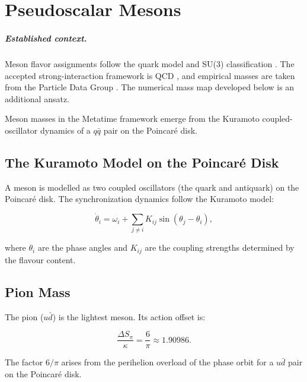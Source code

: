 \chapter{Pseudoscalar Mesons}
\label{ch:pseudoscalar_mesons}


\paragraph{Established context.}
Meson flavor assignments follow the quark model and SU(3) classification
\cite{GellMann1962,GellMann1964,Zweig1964}.  The accepted strong-interaction
framework is QCD \cite{GrossWilczek1973,Politzer1973,Wilson1974}, and empirical
masses are taken from the Particle Data Group \cite{PDG2024}.  The numerical
mass map developed below is an additional ansatz.

Meson masses in the Metatime framework emerge from the Kuramoto
coupled-oscillator dynamics of a \(q\bar{q}\) pair on the Poincar\'{e}
disk.

\section{The Kuramoto Model on the Poincar\'{e} Disk}

A meson is modelled as two coupled oscillators (the quark and antiquark)
on the Poincar\'{e} disk.  The synchronization dynamics follow the Kuramoto
model:

\[
\dot{\theta}_i = \omega_i + \sum_{j \neq i} K_{ij} \sin(\theta_j - \theta_i),
\]

where \(\theta_i\) are the phase angles and \(K_{ij}\) are the coupling
strengths determined by the flavour content.

\section{Pion Mass}

The pion (\(u\bar{d}\)) is the lightest meson.  Its action offset is:

\begin{equation}
\frac{\Delta S_\pi}{\kappa} = \frac{6}{\pi} \approx 1.90986.
\label{eq:pion_action}
\end{equation}

The factor \(6/\pi\) arises from the perihelion overload of the phase orbit
for a \(u\bar{d}\) pair on the Poincar\'{e} disk.

